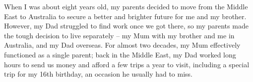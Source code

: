 When I was about eight years old, my parents decided to move from the Middle East to Australia to secure a better and brighter future for me and my brother. However, my Dad struggled to find work once we got there, so my parents made the tough decision to live separately -- my Mum with my brother and me in Australia, and my Dad overseas. For almost two decades, my Mum effectively functioned as a single parent; back in the Middle East, my Dad worked long hours to send us money and afford a few trips a year to visit, including a special trip for my 16th birthday, an occasion he usually had to miss.
